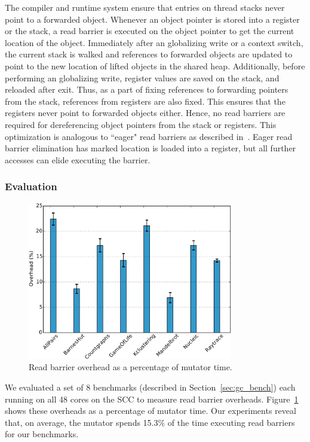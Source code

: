 The compiler and runtime system ensure that entries on thread stacks never
point to a forwarded object. Whenever an object pointer is stored into a
register or the stack, a read barrier is executed on the object pointer to get
the current location of the object. Immediately after an globalizing write or a
context switch, the current stack is walked and references to forwarded objects
are updated to point to the new location of lifted objects in the shared heap.
Additionally, before performing an globalizing write, register values are saved
on the stack, and reloaded after exit. Thus, as a part of fixing references to
forwarding pointers from the stack, references from registers are also fixed.
This ensures that the registers never point to forwarded objects either. Hence,
no read barriers are required for dereferencing object pointers from the stack
or registers. This optimization is analogous to ``eager" read barriers as
described in~\cite{Bacon03}. Eager read barrier elimination has marked
location is loaded into a register, but all further accesses can elide
executing the barrier.

\subsubsection{Evaluation}

\begin{figure}[t]
  \centering
  \includegraphics[width=0.8\textwidth]{Graphs/RB_overhead}
	\caption{Read barrier overhead as a percentage of mutator time.}
  \label{fig:rb-overhead}
\end{figure}

We evaluated a set of 8 benchmarks (described in Section~\ref{sec:gc_bench})
each running on all 48 cores on the SCC to measure read barrier overheads.
Figure~\ref{fig:rb-overhead} shows these overheads as a percentage of mutator
time. Our experiments reveal that, on average, the mutator spends 15.3\% of the
time executing read barriers for our benchmarks.

